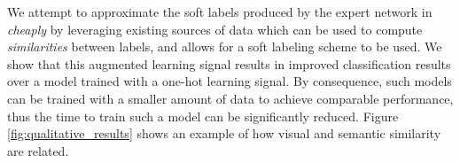 We attempt to approximate the soft labels produced by the expert network in
\cite{hinton2015distilling} \emph{cheaply} by leveraging existing sources of
data which can be used to compute \emph{similarities} between labels, and allows
for a soft labeling scheme to be used.  We show that this augmented learning
signal results in improved classification results over a model trained with a
one-hot learning signal. By consequence, such models can be trained with a
smaller amount of data to achieve comparable performance, thus the time to train
such a model can be significantly reduced.
Figure \ref{fig:qualitative_results} shows an example of how visual and semantic
similarity are related.


